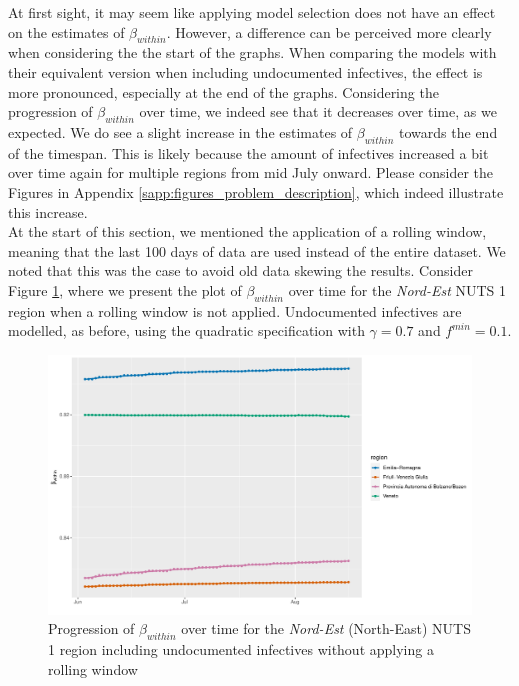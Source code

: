 \documentclass[12pt]{article}
\begin{document}
	At first sight, it may seem like applying model selection does not have an effect on the estimates of $\beta_{within}$. However, a difference can be perceived more clearly when considering the the start of the graphs. When comparing the models with their equivalent version when including undocumented infectives, the effect is more pronounced, especially at the end of the graphs. Considering the progression of $\beta_{within}$ over time, we indeed see that it decreases over time, as we expected. We do see a slight increase in the estimates of $\beta_{within}$ towards the end of the timespan. This is likely because the amount of infectives increased a bit over time again for multiple regions from mid July onward. Please consider the Figures in Appendix \ref{sapp:figures_problem_description}, which indeed illustrate this increase. \\
	
	At the start of this section, we mentioned the application of a rolling window, meaning that the last 100 days of data are used instead of the entire dataset. We noted that this was the case to avoid old data skewing the results. Consider Figure \ref{fig:beta_within_over_time_nordest_not_rolling}, where we present the plot of $\beta_{within}$ over time for the \textit{Nord-Est} NUTS 1 region when a rolling window is not applied. Undocumented infectives are modelled, as before, using the quadratic specification with $\gamma = 0.7$ and $f^{min}=0.1$.
	
	\begin{figure}[H]
	    \centering
        \includegraphics[width=0.95\linewidth]{output/model1_lag3_betawithin_Nord-Est_UndocQuadratic.pdf}
	    \caption{Progression of $\beta_{within}$ over time for the \textit{Nord-Est} (North-East) NUTS 1 region including undocumented infectives without applying a rolling window}
	    \label{fig:beta_within_over_time_nordest_not_rolling}
    \end{figure}
	
\end{document}
